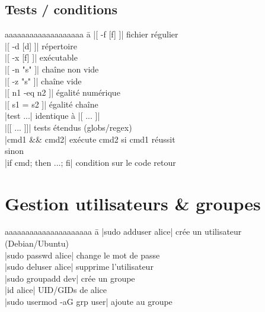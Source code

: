 \documentclass{article}
\begin{document}
\begin{multicols}{4}
    \subsection*{Tests / conditions}
    \begin{tabbing}
        aaaaaaaaaaaaaaaaaaa \= a \kill
        \code|[ -f [f] ]| \> fichier régulier \\
        \code|[ -d [d] ]| \> répertoire \\
        \code|[ -x [f] ]| \> exécutable \\
        \code|[ -n "s" ]| \> chaîne non vide \\
        \code|[ -z "s" ]| \> chaîne vide \\
        \code|[ n1 -eq n2 ]| \> égalité numérique \\
        \code|[ s1 = s2 ]| \> égalité chaîne \\
        \code|test ...| \> identique à \code|[ ... ]| \\
        \code|[[ ... ]]| \> tests étendus (globs/regex) \\
        \code|cmd1 && cmd2| \> exécute cmd2 si cmd1 réussit \\
         \> sinon \\
        \code|if cmd; then ...; fi| condition sur le code retour
    \end{tabbing}

    \section*{Gestion utilisateurs \& groupes}
    \begin{tabbing}
        aaaaaaaaaaaaaaaaaaaaa \= a \kill
        \code|sudo adduser alice| \> crée un utilisateur (Debian/Ubuntu) \\
        \code|sudo passwd alice| \> change le mot de passe \\
        \code|sudo deluser alice| \> supprime l'utilisateur \\
        \code|sudo groupadd dev| \> crée un groupe \\
        \code|id alice| \> UID/GIDs de alice \\
        \code|sudo usermod -aG grp user| ajoute au groupe
    \end{tabbing}


\end{multicols}
\end{document}
